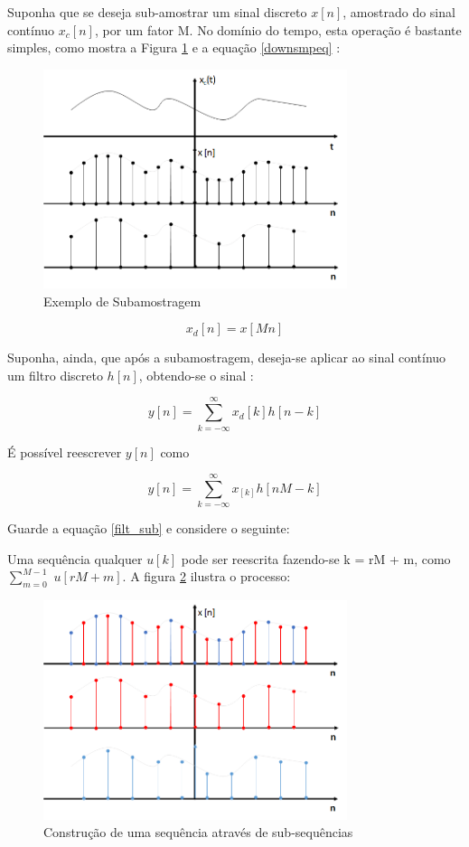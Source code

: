 \par Suponha que se deseja sub-amostrar um sinal discreto $x[n]$, amostrado do sinal contínuo $x_{c}[n]$, por um fator M. No domínio do tempo, esta operação é bastante simples, como mostra a Figura \ref{downsmp} e a equação \ref{downsmpeq} :

\begin{figure}[h!]
\centering
\includegraphics[width=3.5in]{DownSample.png} %
\caption{Exemplo de Subamostragem}
\label{downsmp}
\end{figure}

\begin{equation}\label{downsmpeq}
x_{d}[n] = x[Mn] 
\end{equation}

Suponha, ainda, que após a subamostragem, deseja-se aplicar ao sinal contínuo um filtro discreto $h[n]$, obtendo-se o sinal :

\begin{equation}
y[n] = \sum_{k=-\infty}^{\infty}x_{d}[k]h[n-k]
\end{equation}

É possível reescrever $y[n]$ como 

\begin{equation} \label{filt_sub}
y[n] = \sum_{k=-\infty}^{\infty}x_[k]h[nM-k]
\end{equation}

Guarde a equação \ref{filt_sub} e considere o seguinte: 

Uma sequência qualquer $u[k]$ pode ser reescrita fazendo-se k = rM + m, como $\sum_{m=0}^{M-1}$ $u[rM + m]$. A figura \ref{seq_poly} ilustra o processo:  

\begin{figure}[h!]
\centering
\includegraphics[width=3.5in]{seq_sub.png} %
\caption{Construção de uma sequência através de sub-sequências}
\label{seq_poly}
\end{figure}

